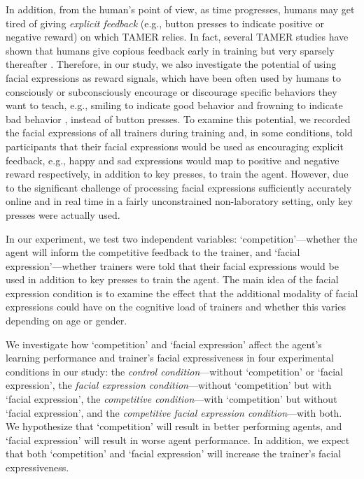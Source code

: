 \documentclass[10pt,journal,compsoc]{IEEEtran}
\begin{document}
In addition, from the human's point of view, as time progresses, humans may get tired of giving \emph{explicit feedback} (e.g., button presses to indicate positive or negative reward) on which TAMER relies. In fact, several TAMER studies have shown that humans give copious feedback early in training but very sparsely thereafter \cite{knox2012humans,li2013using}. Therefore, in our study, we also investigate the potential of using facial expressions as reward signals, which have been often used by humans to consciously or subconsciously encourage or discourage specific behaviors they want to teach, e.g., smiling to indicate good behavior and frowning to indicate bad behavior \cite{vail1994emotion}, instead of button presses.
To examine this potential, we recorded the facial expressions of all trainers during training and, in some conditions, told participants that their facial expressions 
would be used as encouraging explicit feedback, e.g., happy and sad expressions would map to positive and negative reward respectively, 
in addition to key presses, to train the agent. However, due to the significant challenge of processing facial expressions sufficiently accurately online and in real time in a fairly unconstrained non-laboratory setting, only key presses were actually used. 

In our experiment, we test two independent variables: `competition'---whether the agent will inform the competitive feedback to the trainer, and `facial expression'---whether trainers were told that their facial expressions would be used in addition to key presses to train the agent. The main idea of the facial expression condition is to examine the effect that the additional modality of facial expressions could have on the cognitive load of trainers and whether this varies depending on age or gender.

We investigate how `competition' and `facial expression' affect %
the agent's learning performance and trainer's facial expressiveness in four experimental conditions in our study: the \emph{control condition}---without `competition' or `facial expression', the \emph{facial expression condition}---without `competition' but with `facial expression', the \emph{competitive condition}---with `competition' but without `facial expression', and the \emph{competitive facial expression con\-dition}---with both. We hypothesize that `competition' will result in better performing agents, and `facial expression' will %
result in worse agent performance. In addition, we expect that both `competition' and `facial expression' will increase the trainer's facial expressiveness.
\end{document}
